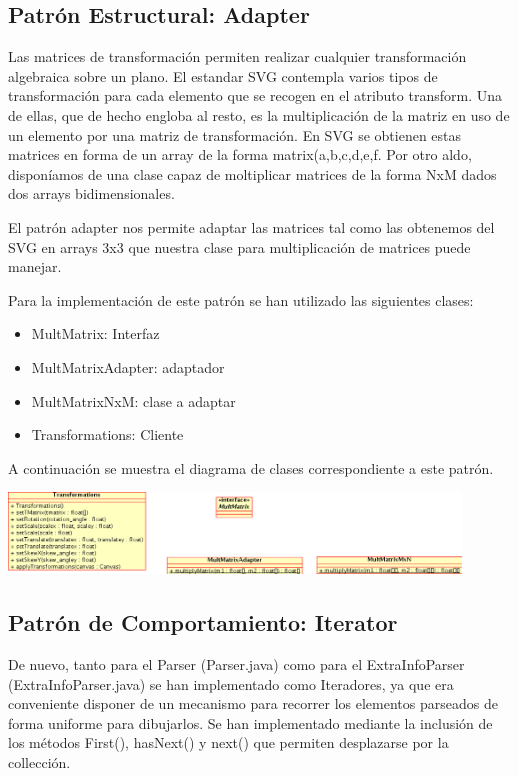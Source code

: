 \documentclass[a4paper,10pt]{article}
\begin{document}
\subsection{Patrón Estructural: Adapter}

Las matrices de transformación permiten realizar cualquier transformación algebraica sobre un plano. El estandar SVG contempla varios tipos de transformación para cada elemento que se recogen en el atributo transform. Una de ellas, que de hecho engloba al resto, es la multiplicación de la matriz en uso de un elemento por una matriz de transformación. En SVG se obtienen estas matrices en forma de un array de la forma matrix(a,b,c,d,e,f. Por otro aldo, disponíamos de una clase capaz de moltiplicar matrices de la forma NxM dados dos arrays bidimensionales.

El patrón adapter nos permite adaptar las matrices tal como las obtenemos del SVG en arrays 3x3 que nuestra clase para multiplicación de matrices puede manejar.

Para la implementación de este patrón se han utilizado las siguientes clases:

\begin{itemize}
\item MultMatrix: Interfaz
\item MultMatrixAdapter: adaptador
\item MultMatrixNxM: clase a adaptar
\item Transformations: Cliente                        
\end{itemize}

A continuación se muestra el diagrama de clases correspondiente a este patrón.

\begin{center}
 \includegraphics[width=12cm]{texres/adapter.png}
\end{center}

\subsection{Patrón de Comportamiento: Iterator}

De nuevo, tanto para el Parser (Parser.java) como para el ExtraInfoParser (ExtraInfoParser.java) se han implementado como Iteradores, ya que era conveniente disponer de un mecanismo para recorrer los elementos parseados de forma uniforme para dibujarlos. Se han implementado mediante la inclusión de los métodos First(), hasNext() y next() que permiten desplazarse por la collección.
\end{document}
